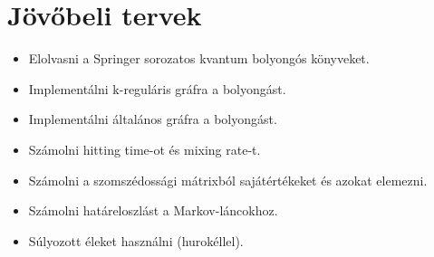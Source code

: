 \chapter{Jövőbeli tervek}

\begin{itemize}
  \item Elolvasni a Springer sorozatos kvantum bolyongós könyveket.
  \item Implementálni k-reguláris gráfra a bolyongást.
  \item Implementálni általános gráfra a bolyongást.
  \item Számolni hitting time-ot és mixing rate-t.
  \item Számolni a szomszédossági mátrixból sajátértékeket és azokat elemezni.
  \item Számolni határeloszlást a Markov-láncokhoz.
  \item Súlyozott éleket használni (hurokéllel).
\end{itemize}